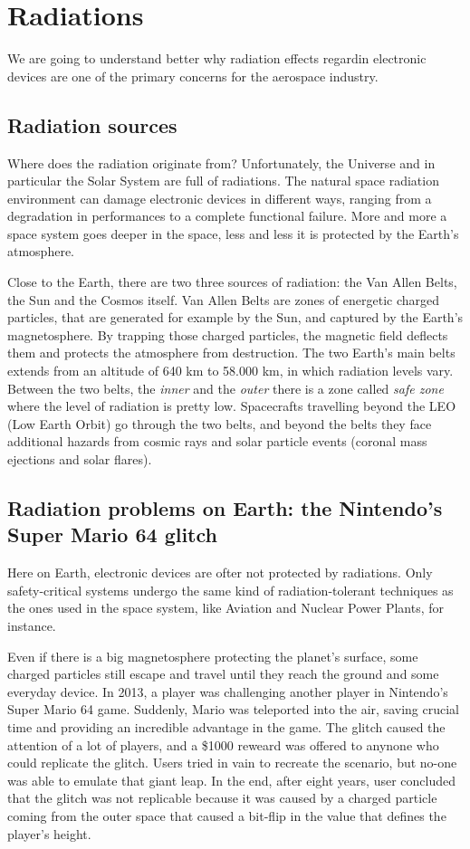\section{Radiations}

We are going to understand better why radiation effects regardin electronic devices are one of the primary concerns for the aerospace industry.\bigskip

\subsection{Radiation sources}
Where does the radiation originate from? Unfortunately, the Universe and in particular the Solar System are full of radiations. The natural space radiation environment can damage electronic devices in different ways, ranging from a degradation in performances to a complete functional failure. More and more a space system goes deeper in the space, less and less it is protected by the Earth's atmosphere.\bigskip

Close to the Earth, there are two three sources of radiation: the Van Allen Belts, the Sun and the Cosmos itself. Van Allen Belts are zones of energetic charged particles, that are generated for example by the Sun, and captured by the Earth's magnetosphere. By trapping those charged particles, the magnetic field deflects them and protects the atmosphere from destruction. The two Earth's main belts extends from an altitude of 640 km to 58.000 km, in which radiation levels vary. Between the two belts, the \textit{inner} and the \textit{outer} there is a zone called \textit{safe zone} where the level of radiation is pretty low. Spacecrafts travelling beyond the LEO (Low Earth Orbit) go through the two belts, and beyond the belts they face additional hazards from cosmic rays and solar particle events (coronal mass ejections and solar flares).


\subsection{Radiation problems on Earth: the Nintendo's Super Mario 64 glitch}

Here on Earth, electronic devices are ofter not protected by radiations. Only safety-critical systems undergo the same kind of radiation-tolerant techniques as the ones used in the space system, like Aviation and Nuclear Power Plants, for instance.\bigskip

Even if there is a big magnetosphere protecting the planet's surface, some charged particles still escape and travel until they reach the ground and some everyday device. In 2013, a player was challenging another player in Nintendo's Super Mario 64 game. Suddenly, Mario was teleported into the air, saving crucial time and providing an incredible advantage in the game. The glitch caused the attention of a lot of players, and a \$1000 reweard was offered to anynone who could replicate the glitch. Users tried in vain to recreate the scenario, but no-one was able to emulate that giant leap. In the end, after eight years, user concluded that the glitch was not replicable because it was caused by a charged particle coming from the outer space that caused a bit-flip in the value that defines the player's height. \bigskip

